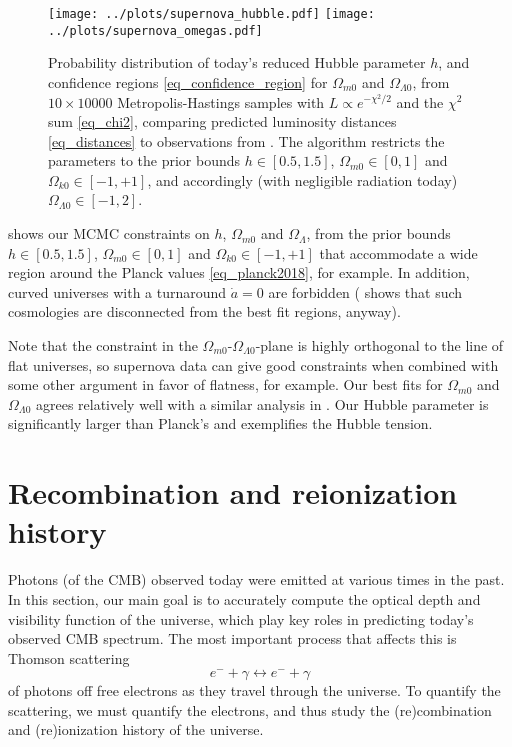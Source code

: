 \documentclass[10pt,a4paper]{article}
\begin{document}
\begin{figure}[b]
	\centering
	\texttt{[image: ../plots/supernova\_hubble.pdf]}
	\texttt{[image: ../plots/supernova\_omegas.pdf]}
	\caption{%
		Probability distribution of today's reduced Hubble parameter $h$,
		and confidence regions \eqref{eq_confidence_region} for $\Omega_{m0}$ and $\Omega_{\Lambda0}$,
		from $10 \times 10000$ Metropolis-Hastings samples with $L \propto e^{-\chi^2/2}$ and the $\chi^2$ sum \eqref{eq_chi2},
		comparing predicted luminosity distances \eqref{eq_distances} to observations from \cite{betouleImprovedCosmologicalConstraints2014}.
		The algorithm restricts the parameters to the prior bounds $h \in [0.5, 1.5]$, $\Omega_{m0} \in [0, 1]$ and $\Omega_{k0} \in [-1, +1]$, and accordingly (with negligible radiation today) $\Omega_{\Lambda0} \in [-1, 2]$.
	}
	\label{fig_supernova_mcmc}
\end{figure}

 shows our MCMC constraints on $h$, $\Omega_{m0}$ and $\Omega_\Lambda$,
from the prior bounds $h \in [0.5, 1.5]$, $\Omega_{m0} \in [0, 1]$ and $\Omega_{k0} \in [-1, +1]$
that accommodate a wide region around the Planck values \eqref{eq_planck2018}, for example.
In addition, curved universes with a turnaround $\dot{a} = 0$ are forbidden
(\cite[Figure 11]{amanullahSpectraLightCurves2010} shows that such cosmologies are disconnected from the best fit regions, anyway).

Note that the constraint in the $\Omega_{m0}$-$\Omega_{\Lambda0}$-plane is highly orthogonal to the line of flat universes,
so supernova data can give good constraints when combined with some other argument in favor of flatness, for example.
Our best fits for $\Omega_{m0}$ and $\Omega_{\Lambda0}$ agrees relatively well with a similar analysis in \cite[Fig. 15]{betouleImprovedCosmologicalConstraints2014}.
Our Hubble parameter is significantly larger than Planck's and exemplifies the Hubble tension.

\clearpage
\section{Recombination and reionization history}

Photons (of the CMB) observed today were emitted at various times in the past.
In this section, our main goal is to accurately compute the optical depth and visibility function of the universe,
which play key roles in predicting today's observed CMB spectrum.
The most important process that affects this is Thomson scattering
\begin{equation}
	e^- + \gamma \leftrightarrow e^- + \gamma
\label{eq_thomson_scattering}
\end{equation}
of photons off free electrons as they travel through the universe.
To quantify the scattering, we must quantify the electrons,
and thus study the (re)combination and (re)ionization history of the universe.
\end{document}
